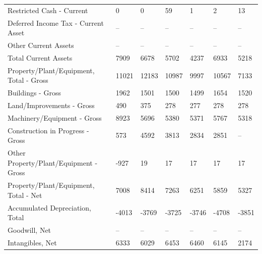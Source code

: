 \documentclass[grad,numbers]{coppe}
\begin{document}
\begin{longtable}[t]{lllllll}
  \hspace{1em}\hspace{1em}Restricted Cash - Current & 0 & 0 & 59 & 1 & 2 & 13\\
  \hspace{1em}\hspace{1em}Deferred Income Tax - Current Asset & -- & -- & -- & -- & -- & --\\
  \hspace{1em}\hspace{1em}Other Current Assets & -- & -- & -- & -- & -- & --\\
  \hspace{1em}Total Current Assets & 7909 & 6678 & 5702 & 4237 & 6933 & 5218\\
  \hspace{1em}Property/Plant/Equipment, Total - Gross & 11021 & 12183 & 10987 & 9997 & 10567 & 7133\\
  \hspace{1em}\hspace{1em}Buildings - Gross & 1962 & 1501 & 1500 & 1499 & 1654 & 1520\\
  \hspace{1em}\hspace{1em}Land/Improvements - Gross & 490 & 375 & 278 & 277 & 278 & 278\\
  \hspace{1em}\hspace{1em}Machinery/Equipment - Gross & 8923 & 5696 & 5380 & 5371 & 5767 & 5318\\
  \hspace{1em}\hspace{1em}Construction in Progress - Gross & 573 & 4592 & 3813 & 2834 & 2851 & --\\
  \hspace{1em}\hspace{1em}Other Property/Plant/Equipment - Gross & -927 & 19 & 17 & 17 & 17 & 17\\
  \hspace{1em}Property/Plant/Equipment, Total - Net & 7008 & 8414 & 7263 & 6251 & 5859 & 5327\\
  \hspace{1em}\hspace{1em}Accumulated Depreciation, Total & -4013 & -3769 & -3725 & -3746 & -4708 & -3851\\
  \hspace{1em}Goodwill, Net & -- & -- & -- & -- & -- & --\\
  \hspace{1em}Intangibles, Net & 6333 & 6029 & 6453 & 6460 & 6145 & 2174\\

\end{longtable}
\end{document}
